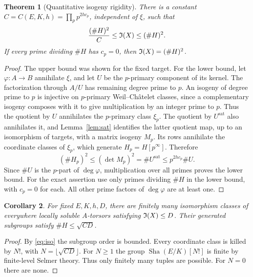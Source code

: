 \documentclass[11pt,a4paper]{article}
\newtheorem{theorem}{Theorem}[section]
\newtheorem{corollary}[theorem]{Corollary}
\theoremstyle{definition}\newtheorem{definition}[theorem]{Definition}
\theoremstyle{remark}\newtheorem{remark}[theorem]{Remark}
\newcommand{\Sha}{\operatorname{\mathrm{Sha}}}
\numberwithin{equation}{section}
\begin{document}
\begin{theorem}[Quantitative isogeny rigidity]\label{thm:iso}
There is a constant $C=C(E,K,h)=\prod_p p^{2hc_p}$, independent of $\xi$, such that
\begin{equation}\label{eq:iso}
\frac{(\#H)^2}{C}\leq\mathfrak I(X)\leq(\#H)^2.
\end{equation}
If every prime dividing $\#H$ has $c_p=0$, then $\mathfrak I(X)=(\#H)^2$.
\end{theorem}
\begin{proof}
The upper bound was shown for the fixed target. For the lower bound, let $\varphi:A\to B$ annihilate $\xi$, and let $U$ be the $p$-primary component of its kernel. The factorization through $A/U$ has remaining degree prime to $p$. An isogeny of degree prime to $p$ is injective on $p$-primary Weil--Ch\^{a}telet classes, since a complementary isogeny composes with it to give multiplication by an integer prime to $p$. Thus the quotient by $U$ annihilates the $p$-primary class $\xi_p$. The quotient by $U^{\mathrm{sat}}$ also annihilates it, and Lemma~\ref{lem:sat} identifies the latter quotient map, up to an isomorphism of targets, with a matrix isogeny $M_p$. Its rows annihilate the coordinate classes of $\xi_p$, which generate $H_p=H[p^\infty]$. Therefore
\[
(\#H_p)^2\leq(\det M_p)^2=\#U^{\mathrm{sat}}
\leq p^{2hc_p}\#U.
\]
Since $\#U$ is the $p$-part of $\deg\varphi$, multiplication over all primes proves the lower bound. For the exact assertion use only primes dividing $\#H$ in the lower bound, with $c_p=0$ for each. All other prime factors of $\deg\varphi$ are at least one.
\end{proof}
\begin{corollary}\label{cor:bound}
For fixed $E,K,h,D$, there are finitely many isomorphism classes of everywhere locally soluble $A$-torsors satisfying $\mathfrak I(X)\leq D$. Their generated subgroups satisfy $\#H\leq\sqrt{CD}$.
\end{corollary}
\begin{proof}
By \eqref{eq:iso} the subgroup order is bounded. Every coordinate class is killed by $N!$, with $N=\lfloor\sqrt{CD}\rfloor$. For $N\geq1$ the group $\Sha(E/K)[N!]$ is finite by finite-level Selmer theory. Thus only finitely many tuples are possible. For $N=0$ there are none.
\end{proof}
\end{document}
